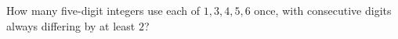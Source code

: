 How many five-digit integers use each of $1,3,4,5,6$ once, with consecutive digits always differing by at least $2$?
